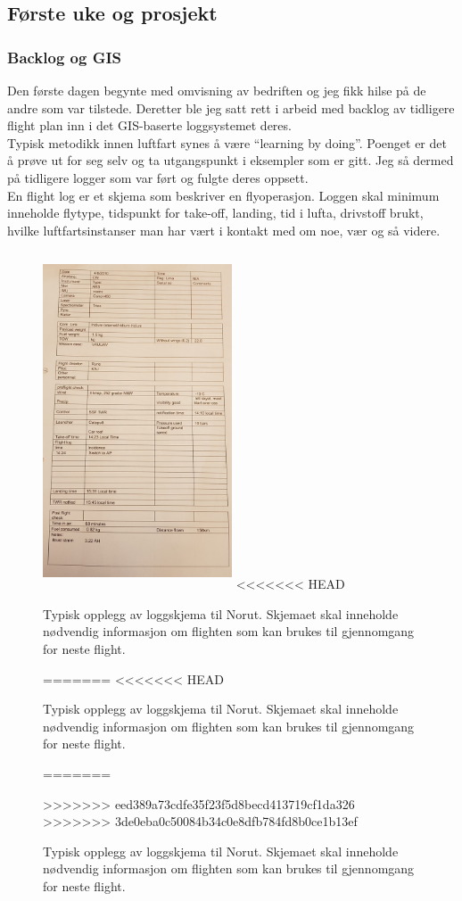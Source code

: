 \documentclass[12pt, a4paper]{article}
\begin{document}
\subsection{Første uke og prosjekt}
\subsubsection{Backlog og GIS}
Den første dagen begynte med omvisning av bedriften og jeg fikk hilse på de andre som var tilstede. Deretter ble jeg satt rett i arbeid med backlog av tidligere flight plan inn i det GIS-baserte loggsystemet deres. \\
Typisk metodikk innen luftfart synes å være ``learning by doing''. Poenget er det å prøve ut for seg selv og ta utgangspunkt i eksempler som er gitt. Jeg så dermed på tidligere logger som var ført og fulgte deres oppsett.\\
En flight log er et skjema som beskriver en flyoperasjon. Loggen skal minimum inneholde flytype, tidspunkt for take-off, landing, tid i lufta, drivstoff brukt, hvilke luftfartsinstanser man har vært i kontakt med om noe, vær og så videre. 

\begin{figure}[ht]
	\centering
	\includegraphics[height= 10cm, width=0.5\textwidth]{bilder/flightlogNorut.png}
<<<<<<< HEAD
		\caption[Loggskjema]{Typisk opplegg av loggskjema til Norut. Skjemaet skal inneholde nødvendig informasjon om flighten som kan brukes til gjennomgang for neste flight. }
=======
<<<<<<< HEAD
		\caption{Typisk opplegg av loggskjema til Norut. Skjemaet skal inneholde nødvendig informasjon om flighten som kan brukes til gjennomgang for neste flight.}
=======
		\caption[Loggskjema]{Typisk opplegg av loggskjema til Norut. Skjemaet skal inneholde nødvendig informasjon om flighten som kan brukes til gjennomgang for neste flight. }
>>>>>>> eed389a73cdfe35f23f5d8becd413719cf1da326
>>>>>>> 3de0eba0c50084b34c0e8dfb784fd8b0ce1b13ef
\end{figure}
\end{document}
